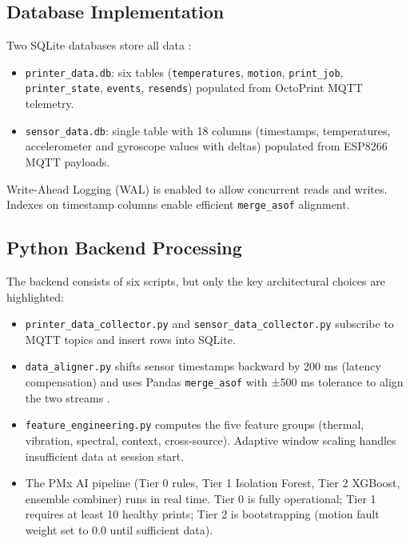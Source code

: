 \subsection{Database Implementation}

Two SQLite databases store all data \cite{sqlite2024}:

\begin{itemize}
    \item \texttt{printer\_data.db}: six tables (\texttt{temperatures}, \texttt{motion}, \texttt{print\_job}, \texttt{printer\_state}, \texttt{events}, \texttt{resends}) populated from OctoPrint MQTT telemetry.
    \item \texttt{sensor\_data.db}: single table with 18 columns (timestamps, temperatures, accelerometer and gyroscope values with deltas) populated from ESP8266 MQTT payloads.
\end{itemize}

Write-Ahead Logging (WAL) is enabled to allow concurrent reads and writes. Indexes on timestamp columns enable efficient \texttt{merge\_asof} alignment.

\subsection{Python Backend Processing}

The backend consists of six scripts, but only the key architectural choices are highlighted:

\begin{itemize}
    \item \texttt{printer\_data\_collector.py} and \texttt{sensor\_data\_collector.py} subscribe to MQTT topics and insert rows into SQLite.
    \item \texttt{data\_aligner.py} shifts sensor timestamps backward by 200 ms (latency compensation) and uses Pandas \texttt{merge\_asof} with ±500 ms tolerance to align the two streams \cite{mckinney2010data}.
    \item \texttt{feature\_engineering.py} computes the five feature groups (thermal, vibration, spectral, context, cross-source). Adaptive window scaling handles insufficient data at session start.
    \item The PMx AI pipeline (Tier 0 rules, Tier 1 Isolation Forest, Tier 2 XGBoost, ensemble combiner) runs in real time. Tier 0 is fully operational; Tier 1 requires at least 10 healthy prints; Tier 2 is bootstrapping (motion fault weight set to 0.0 until sufficient data).
\end{itemize}

